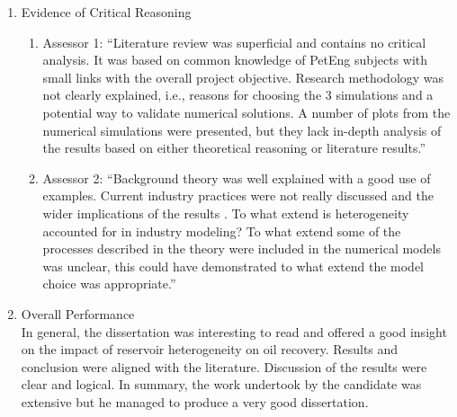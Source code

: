 \documentclass[14pt,twoside]{report}
\begin{document}
\begin{enumerate}
\begin{enumerate}
    \end{enumerate}
%  
   \item Evidence of Critical Reasoning
    \begin{enumerate}%
       \item Assessor 1: ``Literature review was superficial and contains no critical analysis. It was based on common knowledge of PetEng subjects with small links with the overall project objective. Research methodology was not clearly explained, i.e., reasons for choosing the 3 simulations and a potential way to validate numerical solutions. A number of plots from the numerical simulations were presented, but they lack in-depth analysis of the results based on either theoretical reasoning or literature results.''
       \item Assessor 2: ``Background theory was well explained with a good use of examples. Current industry practices were not really discussed and the wider implications of the results . To what extend is heterogeneity accounted for in industry modeling? To what extend some of the processes described in the theory were included in the numerical models was unclear, this could have demonstrated to what extend the model choice was appropriate.''
    \end{enumerate}
%  
  \item Overall Performance \\
    In general, the dissertation was interesting to read and offered a good insight on the impact of reservoir heterogeneity on oil recovery. Results and conclusion were aligned with the literature. Discussion of the results were clear and logical. In summary, the work undertook by the candidate was extensive but he managed to produce a very good dissertation.
%  
\end{enumerate}

\vfill
\clearpage


\bigskip
\end{document}
